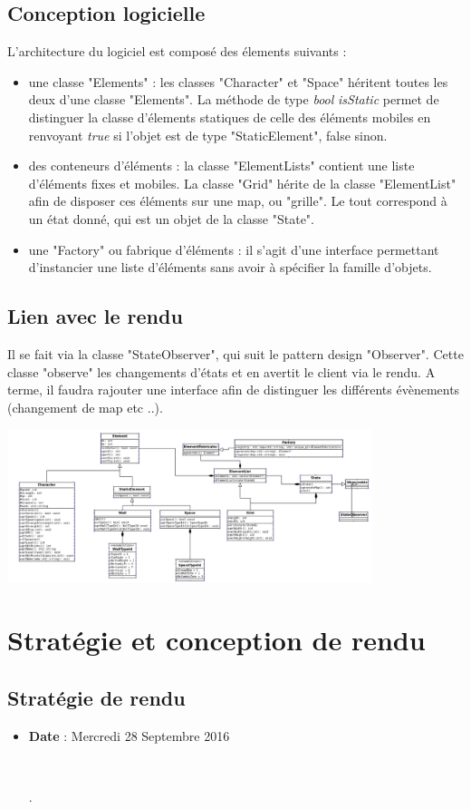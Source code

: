 \documentclass[12pt,a4paper]{report}
\begin{document}
    	\section{Conception logicielle}
	L'architecture du logiciel est composé des élements suivants :
	    \begin{itemize}
	\item une classe "Elements" : les classes "Character" et "Space" héritent toutes les deux d'une classe "Elements". La méthode de type \textit{bool} \textit{isStatic} permet de distinguer la classe d'élements statiques de celle des éléments mobiles en renvoyant \textit{true} si l'objet est de type "StaticElement", false sinon.
	\item des conteneurs d'éléments : la classe "ElementLists" contient une liste d'éléments fixes et mobiles. La classe "Grid" hérite de la classe "ElementList" afin de disposer ces éléments sur une map, ou "grille". Le tout correspond à un état donné, qui est un objet de la classe "State".
	\item une "Factory" ou fabrique d'éléments : il s'agit d'une interface permettant d'instancier une liste d'éléments sans avoir à spécifier la famille d'objets.
        \end{itemize}
	\section{Lien avec le rendu}
	Il se fait via la classe "StateObserver", qui suit le pattern design "Observer". Cette classe "observe" les changements d'états et en avertit le client via le rendu. A terme, il faudra rajouter une interface afin de distinguer les différents évènements (changement de map etc ..).    

\includegraphics[width=0.80\textwidth]{dia.png}

    \chapter{Stratégie et conception de rendu}
    \section{Stratégie de rendu}
    \begin{itemize}
\item \textbf{Date}  : Mercredi 28 Septembre 2016

\par\leavevmode\


.\end{itemize}
    
    
\end{document}
